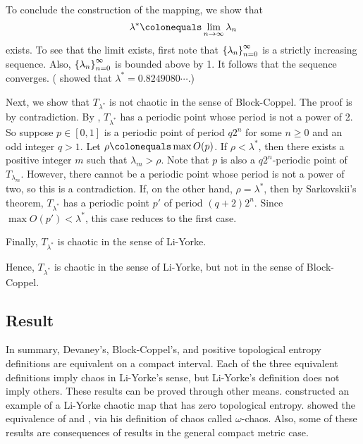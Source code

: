 \documentclass[12pt,twoside,draft]{book}
\begin{document}
\begin{example}
To conclude the construction of the mapping, we show that
\begin{equation*}
  \lambda^* \ceq \lim\limits_{n \to \infty} \lambda_n
\end{equation*}
exists.
To see that the limit exists, first note that $\left \{ \lambda_n \right \}^{\infty}_{n = 0}$ is a strictly increasing sequence.
Also, $\left \{ \lambda_n \right \}^{\infty}_{n = 0}$ is bounded above by 1.
It follows that the sequence converges.
(\citet{misiurewicz1} showed that $\lambda^* = 0.8249080 \cdots$.)

Next, we show that $T_{\lambda^*}$ is not chaotic in the sense of Block-Coppel.
The proof is by contradiction.
By \citet[II, Theorem 14]{blockcoppel}, $T_{\lambda^*}$ has a periodic point whose period is not a power of 2.
So suppose $p \in [0,1]$ is a periodic point of period $q2^n$ for some $n \geq 0$ and an odd integer $q > 1$.
Let $\rho \ceq \max O(p)$.
If $\rho < \lambda^*$, then there exists a positive integer $m$ such that $\lambda_m > \rho$.
Note that $p$ is also a $q2^n$-periodic point of $T_{\lambda_m}$.
However, there cannot be a periodic point whose period is not a power of two, so this is a contradiction.
If, on the other hand, $\rho = \lambda^*$, then by Sarkovskii's theorem, $T_{\lambda^*}$ has a periodic point $p'$ of period $(q+2) 2^n$.
Since $\max O(p') < \lambda^*$, this case reduces to the first case.

Finally, $T_{\lambda^*}$ is chaotic in the sense of Li-Yorke.

Hence, $T_{\lambda^*}$ is chaotic in the sense of Li-Yorke, but not in the sense of Block-Coppel.


  \label{eg:counterexample}
\end{example}

\subsection*{Result}
In summary, Devaney's, Block-Coppel's, and positive topological entropy definitions are equivalent on a compact interval.
Each of the three equivalent definitions imply chaos in Li-Yorke's sense, but Li-Yorke's definition does not imply others.
These results can be proved through other means.
\citet{smital} constructed an example of a Li-Yorke chaotic map that has zero topological entropy.
\citet{omegachaos} showed the equivalence of \dev and \pte, via his definition of chaos called $\omega$-chaos.
Also, some of these results are consequences of results in the general compact metric case.
\end{document}
